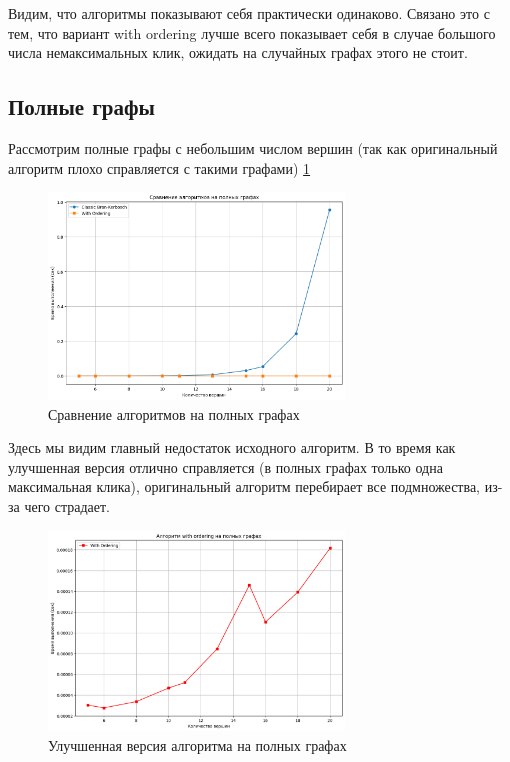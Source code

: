 \documentclass{article}
\begin{document}
Видим, что алгоритмы показывают себя практически одинаково. Связано это с тем, что вариант with ordering лучше всего показывает себя в случае большого числа немаксимальных клик, ожидать на случайных графах этого не стоит.

\subsection{Полные графы}
Рассмотрим полные графы с небольшим числом вершин (так как оригинальный алгоритм плохо справляется с такими графами) \ref{fig:rand4}
\begin{figure}[htbp]
  \centering
  \includegraphics[width=0.7\textwidth]{image/complete_all.png}
  \caption{Сравнение алгоритмов на полных графах}
  \label{fig:rand4}
\end{figure}

Здесь мы видим главный недостаток исходного алгоритм. В то время как улучшенная версия отлично справляется (в полных графах только одна максимальная клика), оригинальный алгоритм перебирает все подмножества, из-за чего страдает.

\begin{figure}[htbp]
  \centering
  \includegraphics[width=0.7\textwidth]{image/complete_ord.png}
  \caption{Улучшенная версия алгоритма на полных графах}
  \label{fig:rand5}
\end{figure}
\end{document}
